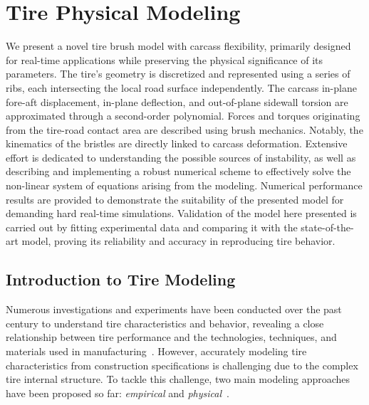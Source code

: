 
\chapter{Tire Physical Modeling}
\label{app3:tirex}

We present a novel tire brush model with carcass flexibility, primarily designed for real-time applications while preserving the physical significance of its parameters. The tire's geometry is discretized and represented using a series of ribs, each intersecting the local road surface independently. The carcass in-plane fore-aft displacement, in-plane deflection, and out-of-plane sidewall torsion are approximated through a second-order polynomial. Forces and torques originating from the tire-road contact area are described using brush mechanics. Notably, the kinematics of the bristles are directly linked to carcass deformation. Extensive effort is dedicated to understanding the possible sources of instability, as well as describing and implementing a robust numerical scheme to effectively solve the non-linear system of equations arising from the modeling. Numerical performance results are provided to demonstrate the suitability of the presented model for demanding hard real-time simulations.   Validation of the model here presented is carried out by fitting experimental data and comparing it with the state-of-the-art \MagicFormulae{} model, proving its reliability and accuracy in reproducing tire behavior.


\section{Introduction to Tire Modeling}
\label{app3:sec:introduction}

Numerous investigations and experiments have been conducted over the past century to understand tire characteristics and behavior, revealing a close relationship between tire performance and the technologies, techniques, and materials used in manufacturing~\cite{nakajima2019advanced, gil2020inplane}. However, accurately modeling tire characteristics from construction specifications is challenging due to the complex tire internal structure. To tackle this challenge, two main modeling approaches have been proposed so far: \emph{empirical} and \emph{physical}~\cite{guiggiani2014science, rill2020road, pacejka2012tire, oertel2015years}.

